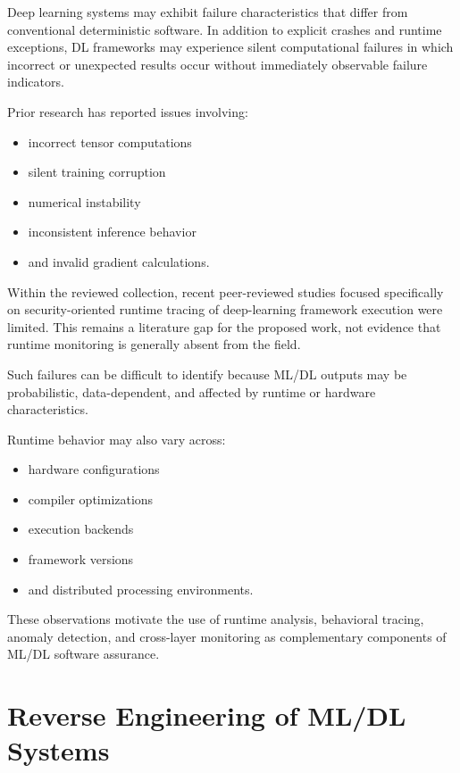 \documentclass[
  12pt,
  letterpaper,
  oneside]{report}
\providecommand{\tightlist}{%
  \setlength{\itemsep}{0pt}\setlength{\parskip}{0pt}}
\begin{document}
Deep learning systems may exhibit failure characteristics that differ
from conventional deterministic software. In addition to explicit
crashes and runtime exceptions, DL frameworks may experience silent
computational failures in which incorrect or unexpected results occur
without immediately observable failure indicators.

Prior research has reported issues involving:

\begin{itemize}
\tightlist
\item
  incorrect tensor computations
\item
  silent training corruption
\item
  numerical instability
\item
  inconsistent inference behavior
\item
  and invalid gradient calculations.
\end{itemize}
\cite{jia2021symptoms,tambon2023silent}

Within the reviewed collection, recent peer-reviewed studies focused
specifically on security-oriented runtime tracing of deep-learning
framework execution were limited. This remains a literature gap for the
proposed work, not evidence that runtime monitoring is generally absent
from the field.

Such failures can be difficult to identify because ML/DL outputs may be
probabilistic, data-dependent, and affected by runtime or hardware
characteristics.

Runtime behavior may also vary across:

\begin{itemize}
\tightlist
\item
  hardware configurations
\item
  compiler optimizations
\item
  execution backends
\item
  framework versions
\item
  and distributed processing environments.
\end{itemize}

These observations motivate the use of runtime analysis, behavioral
tracing, anomaly detection, and cross-layer monitoring as complementary
components of ML/DL software assurance.
\cite{jia2021symptoms,tambon2023silent,wang2022eagle}

\section{Reverse Engineering of ML/DL Systems}\label{814-reverse-engineering-of-mldl-systems}
\end{document}
